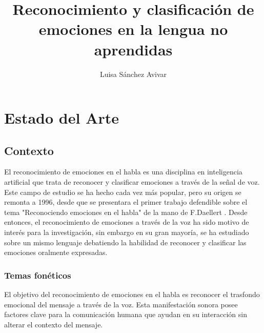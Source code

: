 \documentclass[11pt,a4paper,spanish]{book}
\begin{document}
	\title{Reconocimiento y clasificación de emociones en la lengua no aprendidas}
	\author{Luisa Sánchez Avivar}
	
	\chapter{Estado del Arte}
	\section{Contexto}
	El reconocimiento de emociones en el habla es una disciplina en inteligencia artificial que trata de reconocer y clasificar emociones a través de la señal de voz. Este campo de estudio se ha hecho cada vez más popular, pero su origen se remonta a 1996, desde que se presentara el primer trabajo defendible sobre el tema "Reconociendo emociones en el habla" de la mano de F.Daellert \cite{Dellaert1996}.
	Desde entonces, el reconocimiento de emociones a través de la voz ha sido motivo de interés para la investigación, sin embargo en su gran mayoría, se ha estudiado sobre un mismo lenguaje debatiendo la habilidad de reconocer y clasificar las emociones oralmente expresadas. 
	
	
	\subsection{Temas fonéticos}
	El objetivo del reconocimiento de emociones en el habla es reconocer el trasfondo emocional del mensaje a través de la voz. Esta manifestación sonora posee factores clave para la comunicación humana que ayudan en su interacción sin alterar el contexto del mensaje.\\
	
\end{document}
